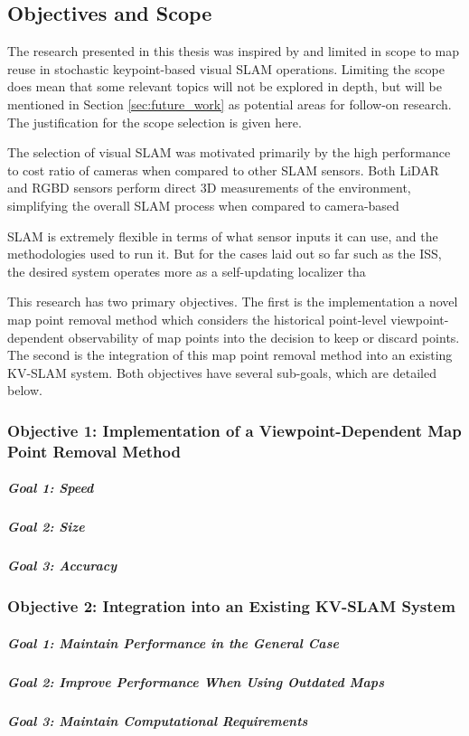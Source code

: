 \subsection{Objectives and Scope}
\label{objectives}

The research presented in this thesis was inspired by and limited in scope to map reuse in stochastic keypoint-based visual SLAM operations. Limiting the scope does mean that some relevant topics will not be explored in depth, but will be mentioned in Section \ref{sec:future_work} as potential areas for follow-on research. The justification for the scope selection is given here.

The selection of visual SLAM was motivated primarily by the high performance to cost ratio of cameras when compared to other SLAM sensors. Both LiDAR and RGBD sensors perform direct 3D measurements of the environment, simplifying the overall SLAM process when compared to camera-based 

SLAM is extremely flexible in terms of what sensor inputs it can use, and the methodologies used to run it. But for the cases laid out so far such as the ISS, the desired system operates more as a self-updating localizer tha

This research has two primary objectives. The first is the implementation a novel map point removal method which considers the historical point-level viewpoint-dependent observability of map points into the decision to keep or discard points. The second is the integration of this map point removal method into an existing KV-SLAM system. Both objectives have several sub-goals, which are detailed below.

\subsubsection*{Objective 1: Implementation of a Viewpoint-Dependent Map Point Removal Method}

\subparagraph{Goal 1: Speed}
\subparagraph{Goal 2: Size}
\subparagraph{Goal 3: Accuracy}

\subsubsection*{Objective 2: Integration into an Existing KV-SLAM System}

\subparagraph{Goal 1: Maintain Performance in the General Case}
\subparagraph{Goal 2: Improve Performance When Using Outdated Maps}
\subparagraph{Goal 3: Maintain Computational Requirements}



